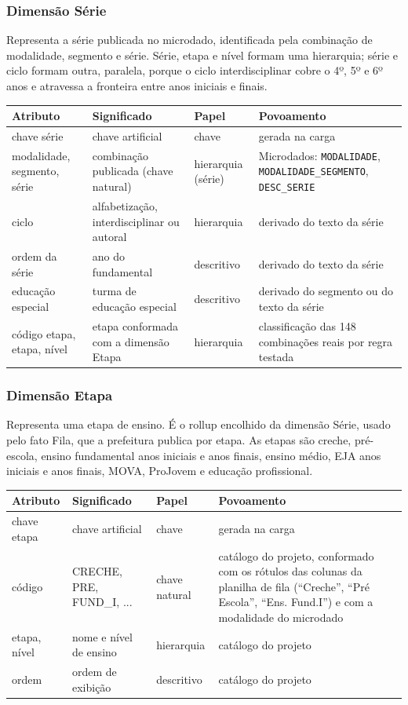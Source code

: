 \documentclass[11pt,a4paper]{article}
\newcommand{\cod}[1]{\texttt{#1}}
\newenvironment{atributos}{%
  \small
  \begin{longtable}{>{\raggedright}p{2.6cm}>{\raggedright}p{4.6cm}>{\raggedright}p{1.9cm}>{\raggedright\arraybackslash}p{5.3cm}}
  \toprule \textbf{Atributo} & \textbf{Significado} & \textbf{Papel} & \textbf{Povoamento}\\ \midrule \endhead
  \bottomrule \endlastfoot
}{\end{longtable}\addtocounter{table}{-1}}
\begin{document}
\subsubsection{Dimensão Série}
Representa a série publicada no microdado, identificada pela combinação de modalidade, segmento e série. Série, etapa e nível formam uma hierarquia; série e ciclo formam outra, paralela, porque o ciclo interdisciplinar cobre o 4º, 5º e 6º anos e atravessa a fronteira entre anos iniciais e finais.

\begin{atributos}
chave série & chave artificial & chave & gerada na carga \\
modalidade, segmento, série & combinação publicada (chave natural) & hierarquia (série) & Microdados: \cod{MODALIDADE}, \cod{MODALIDADE_SEGMENTO}, \cod{DESC_SERIE} \\
ciclo & alfabetização, interdisciplinar ou autoral & hierarquia & derivado do texto da série \\
ordem da série & ano do fundamental & descritivo & derivado do texto da série \\
educação especial & turma de educação especial & descritivo & derivado do segmento ou do texto da série \\
código etapa, etapa, nível & etapa conformada com a dimensão Etapa & hierarquia & classificação das 148 combinações reais por regra testada \\
\end{atributos}

\subsubsection{Dimensão Etapa}
Representa uma etapa de ensino. É o rollup encolhido da dimensão Série, usado pelo fato Fila, que a prefeitura publica por etapa. As etapas são creche, pré-escola, ensino fundamental anos iniciais e anos finais, ensino médio, EJA anos iniciais e anos finais, MOVA, ProJovem e educação profissional.

\begin{atributos}
chave etapa & chave artificial & chave & gerada na carga \\
código & CRECHE, PRE, FUND\_I, ... & chave natural & catálogo do projeto, conformado com os rótulos das colunas da planilha de fila (``Creche'', ``Pré Escola'', ``Ens. Fund.I'') e com a modalidade do microdado \\
etapa, nível & nome e nível de ensino & hierarquia & catálogo do projeto \\
ordem & ordem de exibição & descritivo & catálogo do projeto \\
\end{atributos}
\end{document}
